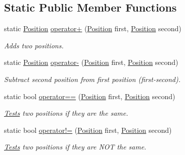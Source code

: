 \subsection*{Static Public Member Functions}
\begin{DoxyCompactItemize}
\item 
static \hyperlink{classCore_1_1Models_1_1Position}{Position} \hyperlink{classCore_1_1Models_1_1Position_aff986057eca807bf3007f6c007e3e0c2}{operator+} (\hyperlink{classCore_1_1Models_1_1Position}{Position} first, \hyperlink{classCore_1_1Models_1_1Position}{Position} second)
\begin{DoxyCompactList}\small\item\em Adds two positions. \end{DoxyCompactList}\item 
static \hyperlink{classCore_1_1Models_1_1Position}{Position} \hyperlink{classCore_1_1Models_1_1Position_afb344750ef4f2b476de90599c6fb9da4}{operator-\/} (\hyperlink{classCore_1_1Models_1_1Position}{Position} first, \hyperlink{classCore_1_1Models_1_1Position}{Position} second)
\begin{DoxyCompactList}\small\item\em Subtract second position from first position (first-\/second). \end{DoxyCompactList}\item 
static bool \hyperlink{classCore_1_1Models_1_1Position_ad4a08e9ecbdc1eeefd3a603372c42c22}{operator==} (\hyperlink{classCore_1_1Models_1_1Position}{Position} first, \hyperlink{classCore_1_1Models_1_1Position}{Position} second)
\begin{DoxyCompactList}\small\item\em \hyperlink{namespaceTests}{Tests} two positions if they are the same. \end{DoxyCompactList}\item 
static bool \hyperlink{classCore_1_1Models_1_1Position_a509b4347ca7f125c97449701409c9f0e}{operator!=} (\hyperlink{classCore_1_1Models_1_1Position}{Position} first, \hyperlink{classCore_1_1Models_1_1Position}{Position} second)
\begin{DoxyCompactList}\small\item\em \hyperlink{namespaceTests}{Tests} two positions if they are N\+O\+T the same. \end{DoxyCompactList}\end{DoxyCompactItemize}
